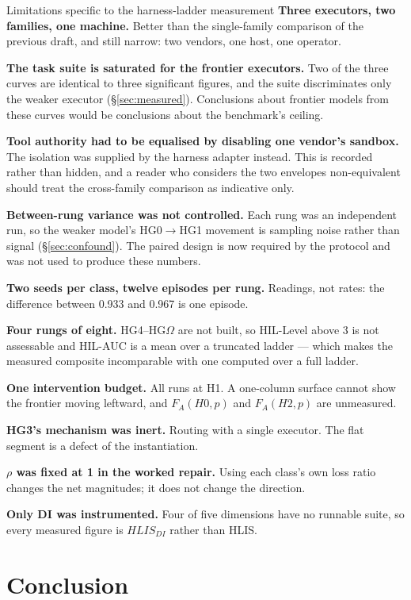 \documentclass[11pt]{article}
\theoremstyle{definition}
\newcommand{\Om}{\ensuremath{\Omega}}
\begin{document}
\begin{cautionbox}{Limitations specific to the harness-ladder measurement}
\textbf{Three executors, two families, one machine.} Better than the single-family comparison of the previous draft, and still narrow: two vendors, one host, one operator.

\textbf{The task suite is saturated for the frontier executors.} Two of the three curves are identical to three significant figures, and the suite discriminates only the weaker executor (\S\ref{sec:measured}). Conclusions about frontier models from these curves would be conclusions about the benchmark's ceiling.

\textbf{Tool authority had to be equalised by disabling one vendor's sandbox.} The isolation was supplied by the harness adapter instead. This is recorded rather than hidden, and a reader who considers the two envelopes non-equivalent should treat the cross-family comparison as indicative only.

\textbf{Between-rung variance was not controlled.} Each rung was an independent run, so the weaker model's HG0$\to$HG1 movement is sampling noise rather than signal (\S\ref{sec:confound}). The paired design is now required by the protocol and was not used to produce these numbers.

\textbf{Two seeds per class, twelve episodes per rung.} Readings, not rates: the difference between 0.933 and 0.967 is one episode.

\textbf{Four rungs of eight.} HG4--HG\Om{} are not built, so HIL-Level above 3 is not assessable and HIL-AUC is a mean over a truncated ladder --- which makes the measured composite incomparable with one computed over a full ladder.

\textbf{One intervention budget.} All runs at H1. A one-column surface cannot show the frontier moving leftward, and $F_A(H0,p)$ and $F_A(H2,p)$ are unmeasured.

\textbf{HG3's mechanism was inert.} Routing with a single executor. The flat segment is a defect of the instantiation.

\textbf{$\rho$ was fixed at 1 in the worked repair.} Using each class's own loss ratio changes the net magnitudes; it does not change the direction.

\textbf{Only DI was instrumented.} Four of five dimensions have no runnable suite, so every measured figure is $HLIS_{DI}$ rather than HLIS.
\end{cautionbox}

\section{Conclusion}
\end{document}
